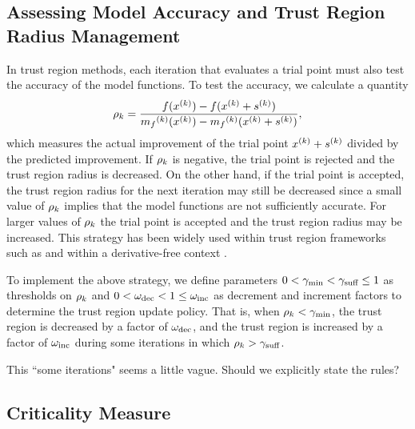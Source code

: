 \documentclass{article}
\begin{document}
\subsection{Assessing Model Accuracy and Trust Region Radius Management}

\label{rhosection}

In trust region methods, each iteration that evaluates a trial point must also test the accuracy of the model functions.
To test the accuracy, we calculate a quantity
\begin{align}
\label{define_rhok}
\rho_k = \frac{f(x^{(k)}) - f(x^{(k)}+{{s}^{(k)}})}{{{m}_f}^{(k)}(x^{(k)}) - {{m}_f}^{(k)}(x^{(k)}+{{s}^{(k)}})},
\end{align}
which measures the actual improvement of the trial point $x^{(k)}+{{s}^{(k)}}$ divided by the predicted improvement.  If $\rho_k$ is negative, the trial point is rejected and the trust region radius is decreased.   On the other hand, if the trial point is accepted, the trust region radius for the next iteration may still be decreased since 
a small value of $\rho_k$ implies that the model functions are not sufficiently accurate.   For larger values of $\rho_k$ the trial point is accepted and the trust region radius may be increased.
This strategy has been widely used within trust region frameworks such as \cite{Conn:2000:TM:357813} and within a derivative-free context \cite{introduction_book}.

To implement the above strategy,  we define parameters
$
0 < \gamma_{\textrm{min}} < \gamma_{\textrm{suff}} \le 1
$
as thresholds on $\rho_k$ and
$
0 < \omega_{\text{dec}} < 1 \le \omega_{\text{inc}}
$
as decrement and increment factors to determine the trust region update policy.
That is, when $\rho_k < \gamma_{\textrm{min}}$, the trust region is decreased by a factor of $\omega_{\text{dec}}$, and the trust region is increased by a factor of $\omega_{\text{inc}}$
during some iterations in which $\rho_k > \gamma_{\textrm{suff}}$.

\color{magenta}
This ``some iterations" seems a little vague. Should we explicitly state the rules?
\color{black}


\subsection{Criticality Measure}

\label{criticality_measure_section}
\label{criticallity_measure_section}

\end{document}

